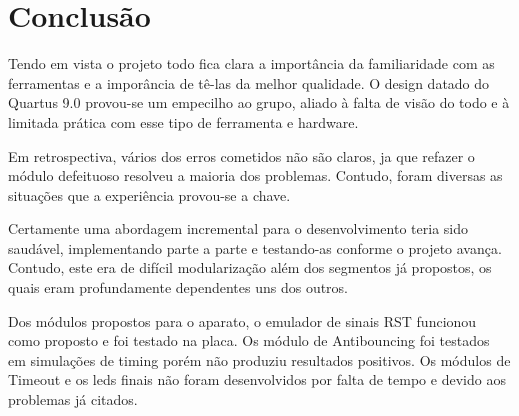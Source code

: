 \documentclass[12pt,a4paper,openany]{abntex2}
\begin{document}
\chapter{Conclusão}

Tendo em vista o projeto todo fica clara a importância da familiaridade com as ferramentas e a imporância de tê-las da melhor qualidade. O design datado do Quartus 9.0 provou-se um empecilho ao grupo, aliado à falta de visão do todo e à limitada prática com esse tipo de ferramenta e hardware.

Em retrospectiva, vários dos erros cometidos não são claros, ja que refazer o módulo defeituoso resolveu a maioria dos problemas. Contudo, foram diversas as situações que a experiência provou-se a chave.

Certamente uma abordagem incremental para o desenvolvimento teria sido saudável, implementando parte a parte e testando-as conforme o projeto avança. Contudo, este era de difícil modularização além dos segmentos já propostos, os quais eram profundamente dependentes uns dos outros.

Dos módulos propostos para o aparato, o emulador de sinais RST funcionou como proposto e foi testado na placa. Os módulo de Antibouncing foi testados em simulações de timing porém não produziu resultados positivos. Os módulos de Timeout e os leds finais não foram desenvolvidos por falta de tempo e devido aos problemas já citados.
\end{document}
